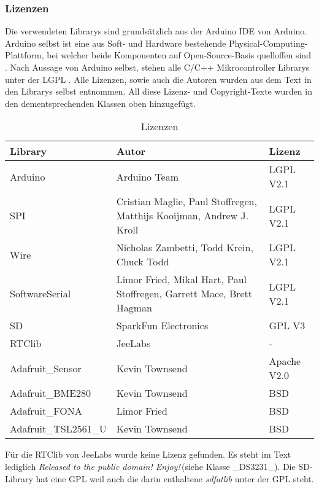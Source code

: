 \subsubsection{Lizenzen}
\label{subsubsec:lizenzen}

Die verwendeten Librarys sind grundsätzlich aus der Arduino IDE von Arduino. Arduino selbst ist eine aus Soft- und Hardware bestehende Physical-Computing-Plattform, bei welcher beide Komponenten auf Open-Source-Basis quelloffen sind \cite{arduinoWiki}. Nach Aussage von Arduino selbst, stehen alle C/C++ Mikrocontroller Librarys unter der LGPL \cite{ArduinoLicense2019}. Alle Lizenzen, sowie auch die Autoren wurden aus dem Text in den Librarys selbst entnommen. All diese Lizenz- und Copyright-Texte wurden in den dementsprechenden Klassen oben hinzugefügt.\\

\begin{table}[h]
\centering
\caption{Lizenzen}
\label{tab:lizenzen}
\begin{tabular}{|l|l|l|}
\hline 
\textbf{Library} & \textbf{Autor} & \textbf{Lizenz} \\ 
\hline 
Arduino & Arduino Team & LGPL V2.1 \\ 
\hline 
SPI & Cristian Maglie, Paul Stoffregen, Matthijs Kooijman, Andrew J. Kroll & LGPL V2.1 \\ 
\hline 
Wire & Nicholas Zambetti, Todd Krein, Chuck Todd & LGPL V2.1 \\ 
\hline 
SoftwareSerial & Limor Fried, Mikal Hart, Paul Stoffregen, Garrett Mace, Brett Hagman & LGPL V2.1 \\ 
\hline 
SD & SparkFun Electronics & GPL V3 \\ 
\hline 
RTClib & JeeLabs & - \\ 
\hline 
Adafruit\_Sensor & Kevin Townsend & Apache V2.0 \\ 
\hline 
Adafruit\_BME280 & Kevin Townsend & BSD \\ 
\hline 
Adafruit\_FONA & Limor Fried & BSD \\ 
\hline 
Adafruit\_TSL2561\_U & Kevin Townsend & BSD \\ 
\hline 
\end{tabular} 
\end{table}

Für die RTClib von JeeLabs wurde keine Lizenz gefunden. Es steht im Text lediglich \glqq \textit{Released to the public domain! Enjoy!}\grqq\,(siehe Klasse \_DS3231\_). Die SD-Library hat eine GPL weil auch die darin enthaltene \textit{sdfatlib} unter der GPL steht.\\
